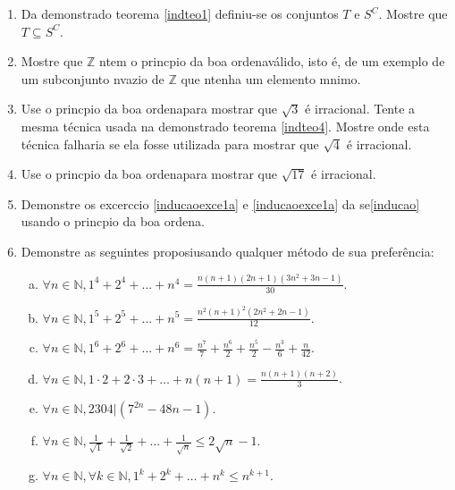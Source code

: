 \begin{enumerate}[{\bf 1.}]

\item Da demonstra\cao do teorema \ref{indteo1} definiu-se os conjuntos $T$ e $S^C$. Mostre que $T\subseteq S^C$.

\item Mostre que $\mathbb{Z}$ n\ao tem o princ\ih pio da boa ordena\cao v\'alido, isto \'e, de um exemplo de um subconjunto n\ao vazio de $\mathbb{Z}$ que n\ao tenha um elemento m\ih nimo.

\item Use o princ\ih pio da boa ordena\cao para mostrar que $\sqrt{3}$ \'e irracional. Tente a mesma t\'ecnica usada na demonstra\cao do teorema \ref{indteo4}. Mostre onde esta t\'ecnica falharia se ela fosse utilizada para mostrar que $\sqrt{4}$ \'e irracional.

\item Use o princ\ih pio da boa ordena\cao para mostrar que $\sqrt{17}$ \'e irracional.

\item Demonstre os excerc\ih cio \ref{inducaoexce1a} e \ref{inducaoexce1a} da se\cao \ref{inducao} usando o princ\ih pio da boa ordena\caoi.

\item Demonstre as seguintes proposi\cois usando qualquer m\'etodo de sua prefer\^encia:
\begin{enumerate}[a)]
\item $\forall n\in\mathbb{N}, 1^4+2^4+\ldots+n^4=\displaystyle\frac{n(n+1)(2n+1)(3n^2+3n-1)}{30}$.
\item $\forall n\in\mathbb{N}, 1^5+2^5+\ldots+n^5=\displaystyle\frac{n^2(n+1)^2(2n^2+2n-1)}{12}$.
\item $\forall n\in\mathbb{N}, 1^6+2^6+\ldots+n^6=\displaystyle\frac{n^7}{7}+\frac{n^6}{2}+\frac{n^5}{2}-\frac{n^3}{6}+\frac{n}{42}$.
\item $\forall n\in\mathbb{N}, 1\cdot 2+ 2\cdot 3+\ldots+n(n+1)=\displaystyle\frac{n(n+1)(n+2)}{3}$.
\item $\forall n\in\mathbb{N}, 2304|(7^{2n}-48n-1)$.
\item $\forall n\in\mathbb{N}, \displaystyle\frac{1}{\sqrt{1}}+\frac{1}{\sqrt{2}}+\ldots+\frac{1}{\sqrt{n}}\leq 2\sqrt{n}-1$.
\item $\forall n\in\mathbb{N}, \forall k\in\mathbb{N}, 1^k+2^k+\ldots+n^k\leq n^{k+1}$.
\end{enumerate}


\end{enumerate}
